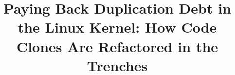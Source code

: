 \documentclass[10pt,conference]{IEEEtran}
\begin{document}
\makeatletter
\newcommand{\linebreakand}{%
  \end{@IEEEauthorhalign}
  \hfill\mbox{}\par
  \mbox{}\hfill\begin{@IEEEauthorhalign}
}
\makeatother

\title{Paying Back Duplication Debt in the Linux Kernel: How Code Clones Are Refactored in the Trenches}

\author{
}


\maketitle

\end{document}
